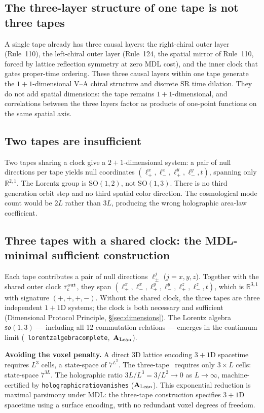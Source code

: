 \documentclass[11pt,openany]{book}
\theoremstyle{remark}
\newcommand{\lean}[1]{%
  \penalty-100
  \begingroup\def\_{\textunderscore\allowbreak}\texttt{#1}\endgroup}
\newcommand{\CMCA}{\text{CMCA}}
\newcommand{\CatAL}{\ensuremath{\textbf{A}_{\rm Lean}}}
\begin{document}
\subsection*{The three-layer structure of one tape is not three tapes}

A single tape already has three causal layers: the right-chiral outer layer (Rule~110),
the left-chiral outer layer (Rule~124, the spatial mirror of Rule~110, forced by lattice
reflection symmetry at zero MDL cost), and the inner clock that gates proper-time ordering.
These three causal layers within one tape generate the $1{+}1$-dimensional V--A chiral
structure and discrete SR time dilation.
They do not add spatial dimensions: the tape remains $1{+}1$-dimensional, and
correlations between the three layers factor as products of one-point functions on the
same spatial axis.

\subsection*{Two tapes are insufficient}

Two tapes sharing a clock give a $2{+}1$-dimensional system: a pair of null directions per
tape yields null coordinates $(\ell_+^x, \ell_-^x, \ell_+^y, \ell_-^y, t)$, spanning
only $\mathbb{R}^{2,1}$.
The Lorentz group is $\mathrm{SO}(1,2)$, not $\mathrm{SO}(1,3)$.
There is no third generation orbit step and no third spatial color direction.
The cosmological mode count would be $2L$ rather than $3L$, producing the wrong
holographic area-law coefficient.

\subsection*{Three tapes with a shared clock: the MDL-minimal sufficient construction}

Each tape contributes a pair of null directions $\ell_\pm^j$ ($j = x, y, z$).
Together with the shared outer clock $\tau_c^{\rm out}$, they span
$(\ell_+^x, \ell_-^x, \ell_+^y, \ell_-^y, \ell_+^z, \ell_-^z, t)$, which is
$\mathbb{R}^{3,1}$ with signature $(+,+,+,-)$.
Without the shared clock, the three tapes are three independent $1{+}1$D systems; the clock
is both necessary and sufficient (Dimensional Protocol Principle, \S\ref{sec:dimensions}).
The Lorentz algebra $\mathfrak{so}(1,3)$ --- including all 12 commutation relations ---
emerges in the continuum limit \mbox{(\lean{lorentz\_algebra\_complete}, \CatAL)}.

\textbf{Avoiding the voxel penalty.}
A direct 3D lattice encoding $3{+}1$D spacetime requires $L^3$ cells, a state-space of
$7^{L^3}$.
The three-tape \CMCA\ requires only $3 \times L$ cells: state-space $7^{3L}$.
The holographic ratio $3L/L^3 = 3/L^2 \to 0$ as $L\to\infty$, machine-certified by
\lean{holographic\_ratio\_vanishes} \mbox{(\CatAL)}.
This exponential reduction is maximal parsimony under MDL: the three-tape construction
specifies $3{+}1$D spacetime using a surface encoding, with no redundant voxel degrees
of freedom.
\end{document}
